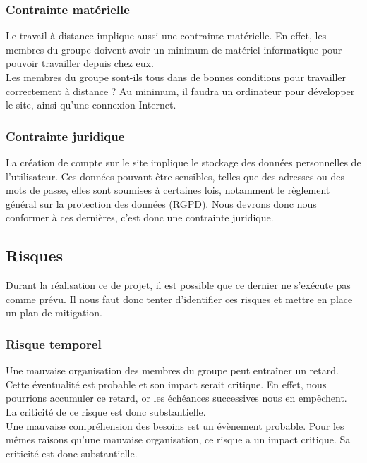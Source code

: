 \documentclass[a4paper,11pt]{article}
\begin{document}
\subsubsection{Contrainte matérielle}

Le travail à distance implique aussi une contrainte matérielle. En effet, les membres du groupe doivent
avoir un minimum de matériel informatique pour pouvoir travailler depuis chez eux.\\

Les membres du groupe sont-ils tous dans de bonnes conditions pour travailler correctement à
distance ? Au minimum, il faudra un ordinateur pour développer le site, ainsi qu’une connexion
Internet.\\

\subsubsection{Contrainte juridique}

La création de compte sur le site implique le stockage des données personnelles de l’utilisateur. Ces
données pouvant être sensibles, telles que des adresses ou des mots de passe, elles sont soumises à
certaines lois, notamment le règlement général sur la protection des données (RGPD). Nous devrons donc nous
conformer à ces dernières, c'est donc une contrainte juridique.\\

\subsection{Risques}

Durant la réalisation ce de projet, il est possible que ce dernier ne s’exécute pas comme prévu. Il nous
faut donc tenter d’identifier ces risques et mettre en place un plan de mitigation.\\

\subsubsection{Risque temporel}

Une mauvaise organisation des membres du groupe peut entraîner un retard. Cette éventualité est
probable et son impact serait critique. En effet, nous pourrions accumuler ce retard, or les échéances
successives nous en empêchent. La criticité de ce risque est donc substantielle.\\

Une mauvaise compréhension des besoins est un évènement probable. Pour les mêmes raisons
qu'une mauvaise organisation, ce risque a un impact critique. Sa criticité est donc substantielle.\\
\end{document}

